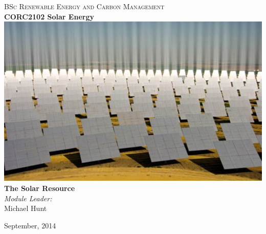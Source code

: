 \documentclass[class=scrartcl, crop=false,parskip=half]{standalone}
\begin{document}
\begin{titlepage}
\vbox{ }

\vbox{ }

\begin{center}
\textsc{\Large BSc Renewable Energy and Carbon Management}\\[0.5cm]
\vbox{ }
{ \huge \bfseries CORC2102 Solar Energy}\\[1.0cm]
\includegraphics[width=1.0\textwidth]{../figures/Sanlucar-la-Mayor.jpg}\\[1cm]

{ \huge \bfseries The Solar Resource}\\[1.0cm]


\emph{Module Leader:}\\
Michael Hunt

\vfill
{\large September, 2014}
\end{center}
\end{titlepage}
\end{document}
